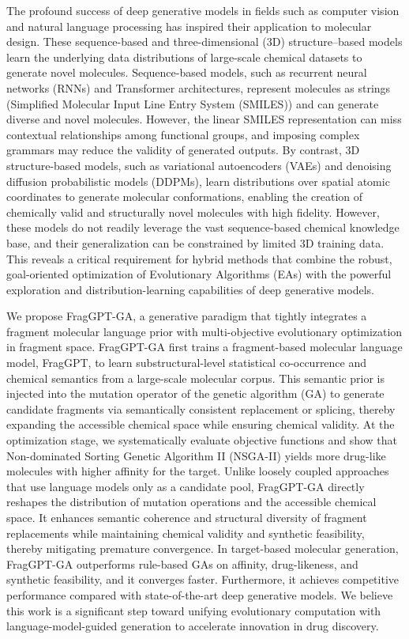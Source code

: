 \documentclass[lettersize,journal]{IEEEtran}
\begin{document}
\IEEEpubidadjcol 
The profound success of deep generative models in fields such as computer vision and natural language processing has inspired their application to molecular design. These sequence-based and three-dimensional (3D) structure–based models learn the underlying data distributions of large-scale chemical datasets to generate novel molecules. Sequence-based models, such as recurrent neural networks (RNNs) and Transformer architectures, represent molecules as strings (Simplified Molecular Input Line Entry System (SMILES)) and can generate diverse and novel molecules. However, the linear SMILES representation can miss contextual relationships among functional groups, and imposing complex grammars may reduce the validity of generated outputs. By contrast, 3D structure-based models, such as variational autoencoders (VAEs) and denoising diffusion probabilistic models (DDPMs), learn distributions over spatial atomic coordinates to generate molecular conformations, enabling the creation of chemically valid and structurally novel molecules with high fidelity. However, these models do not readily leverage the vast sequence-based chemical knowledge base, and their generalization can be constrained by limited 3D training data. This reveals a critical requirement for hybrid methods that combine the robust, goal-oriented optimization of Evolutionary Algorithms (EAs) with the powerful exploration and distribution-learning capabilities of deep generative models.

We propose FragGPT-GA, a generative paradigm that tightly integrates a fragment molecular language prior with multi-objective evolutionary optimization in fragment space. FragGPT-GA first trains a fragment-based molecular language model, FragGPT, to learn substructural-level statistical co-occurrence and chemical semantics from a large-scale molecular corpus. This semantic prior is injected into the mutation operator of the genetic algorithm (GA) to generate candidate fragments via semantically consistent replacement or splicing, thereby expanding the accessible chemical space while ensuring chemical validity. At the optimization stage, we systematically evaluate objective functions and show that Non-dominated Sorting Genetic Algorithm II (NSGA-II\cite{deb2002fast}) yields more drug-like molecules with higher affinity for the target. Unlike loosely coupled approaches that use language models only as a candidate pool, FragGPT-GA directly reshapes the distribution of mutation operations and the accessible chemical space. It enhances semantic coherence and structural diversity of fragment replacements while maintaining chemical validity and synthetic feasibility, thereby mitigating premature convergence. In target-based molecular generation, FragGPT-GA outperforms rule-based GAs on affinity, drug-likeness, and synthetic feasibility, and it converges faster. Furthermore, it achieves competitive performance compared with state-of-the-art deep generative models. We believe this work is a significant step toward unifying evolutionary computation with language-model-guided generation to accelerate innovation in drug discovery.
\end{document}
